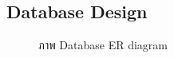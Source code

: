 \documentclass[12pt,oneside,openright,a4paper]{cpe-thai-project}
\begin{document}
\begin{landscape}
\section{Database Design}
\begin{figure}[!ht]\centering
    \setlength{\fboxrule}{0.2mm} %
    \setlength{\fboxsep}{1cm}
    \caption{ภาพ Database ER diagram}\label{fig:database}
   \end{figure}
  \end{landscape}

\newpage
\end{document}
